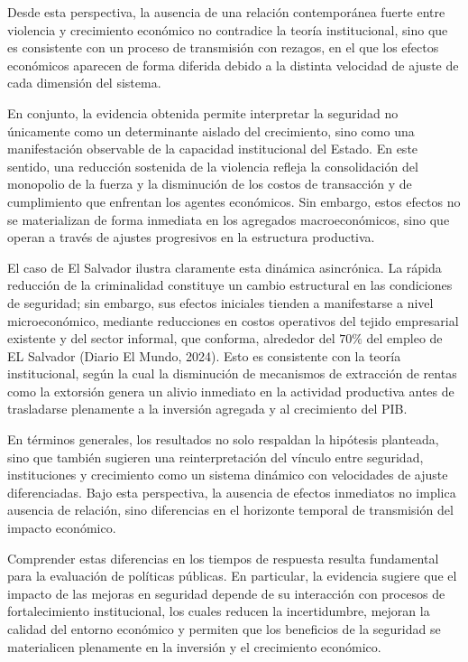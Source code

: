 \documentclass[11pt,a4paper]{article}
\begin{document}
Desde esta perspectiva, la ausencia de una relación contemporánea fuerte entre violencia y crecimiento económico no contradice la teoría institucional, sino que es consistente con un proceso de transmisión con rezagos, en el que los efectos económicos aparecen de forma diferida debido a la distinta velocidad de ajuste de cada dimensión del sistema.

En conjunto, la evidencia obtenida permite interpretar la seguridad no únicamente como un determinante aislado del crecimiento, sino como una manifestación observable de la capacidad institucional del Estado. En este sentido, una reducción sostenida de la violencia refleja la consolidación del monopolio de la fuerza y la disminución de los costos de transacción y de cumplimiento que enfrentan los agentes económicos. Sin embargo, estos efectos no se materializan de forma inmediata en los agregados macroeconómicos, sino que operan a través de ajustes progresivos en la estructura productiva.

El caso de El Salvador ilustra claramente esta dinámica asincrónica. La rápida reducción de la criminalidad constituye un cambio estructural en las condiciones de seguridad; sin embargo, sus efectos iniciales tienden a manifestarse a nivel microeconómico, mediante reducciones en costos operativos del tejido empresarial existente y del sector informal, que conforma, alrededor del $70\%$ del empleo de EL Salvador (Diario El Mundo, 2024). Esto es consistente con la teoría institucional, según la cual la disminución de mecanismos de extracción de rentas como la extorsión genera un alivio inmediato en la actividad productiva antes de trasladarse plenamente a la inversión agregada y al crecimiento del PIB.

En términos generales, los resultados no solo respaldan la hipótesis planteada, sino que también sugieren una reinterpretación del vínculo entre seguridad, instituciones y crecimiento como un sistema dinámico con velocidades de ajuste diferenciadas. Bajo esta perspectiva, la ausencia de efectos inmediatos no implica ausencia de relación, sino diferencias en el horizonte temporal de transmisión del impacto económico.

Comprender estas diferencias en los tiempos de respuesta resulta fundamental para la evaluación de políticas públicas. En particular, la evidencia sugiere que el impacto de las mejoras en seguridad depende de su interacción con procesos de fortalecimiento institucional, los cuales reducen la incertidumbre, mejoran la calidad del entorno económico y permiten que los beneficios de la seguridad se materialicen plenamente en la inversión y el crecimiento económico.
\end{document}
